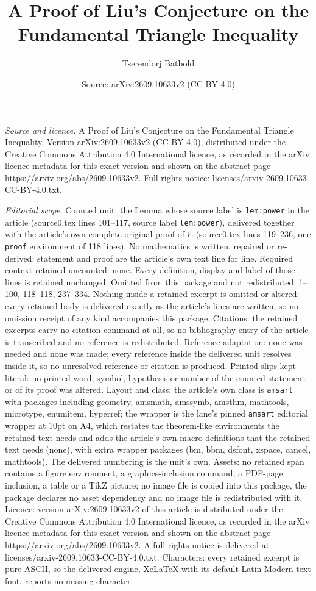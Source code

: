 \documentclass[10pt,a4paper]{amsart}
\title[A Proof of Liu's Conjecture on the Fundamental Triangle Ineq]{A Proof of Liu's Conjecture on the Fundamental Triangle Inequality}
\author{Tserendorj Batbold}
\date{Source: arXiv:2609.10633v2 (CC BY 4.0)}
\begin{document}
\maketitle

\noindent\emph{Source and licence.} A Proof of Liu's Conjecture on the Fundamental Triangle Inequality. Version arXiv:2609.10633v2 (CC BY 4.0), distributed under the Creative Commons Attribution 4.0 International licence, as recorded in the arXiv licence metadata for this exact version and shown on the abstract page https://arxiv.org/abs/2609.10633v2. Full rights notice: licenses/arxiv-2609.10633-CC-BY-4.0.txt.\par\smallskip

\noindent\textit{Editorial scope.} Counted unit: the Lemma whose source label is \texttt{lem:power} in the article (source0.tex lines 101--117, source label \texttt{lem:power}), delivered together with the article's own complete original proof of it (source0.tex lines 119--236, one \texttt{proof} environment of 118 lines). No mathematics is written, repaired or re-derived: statement and proof are the article's own text line for line. Required context retained uncounted: none. Every definition, display and label of those lines is retained unchanged. Omitted from this package and not redistributed: 1--100, 118--118, 237--334. Nothing inside a retained excerpt is omitted or altered: every retained body is delivered exactly as the article's lines are written, so no omission receipt of any kind accompanies this package. Citations: the retained excerpts carry no citation command at all, so no bibliography entry of the article is transcribed and no reference is redistributed. Reference adaptation: none was needed and none was made; every reference inside the delivered unit resolves inside it, so no unresolved reference or citation is produced. Printed slips kept literal: no printed word, symbol, hypothesis or number of the counted statement or of its proof was altered. Layout and class: the article's own class is \texttt{amsart} with packages including geometry, amsmath, amssymb, amsthm, mathtools, microtype, enumitem, hyperref; the wrapper is the lane's pinned \texttt{amsart} editorial wrapper at 10pt on A4, which restates the theorem-like environments the retained text needs and adds the article's own macro definitions that the retained text needs (none), with extra wrapper packages (bm, bbm, dsfont, xspace, cancel, mathtools). The delivered numbering is the unit's own. Assets: no retained span contains a figure environment, a graphics-inclusion command, a PDF-page inclusion, a table or a TikZ picture; no image file is copied into this package, the package declares no asset dependency and no image file is redistributed with it. Licence: version arXiv:2609.10633v2 of this article is distributed under the Creative Commons Attribution 4.0 International licence, as recorded in the arXiv licence metadata for this exact version and shown on the abstract page https://arxiv.org/abs/2609.10633v2. A full rights notice is delivered at licenses/arxiv-2609.10633-CC-BY-4.0.txt. Characters: every retained excerpt is pure ASCII, so the delivered engine, XeLaTeX with its default Latin Modern text font, reports no missing character.
\end{document}

